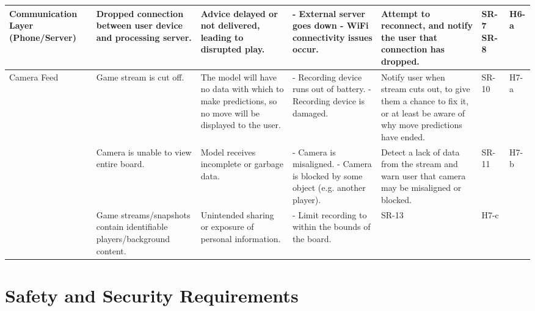 \documentclass{article}
\begin{document}
\begin{landscape}
\begin{tabularx}{\linewidth}{|P{2.5cm}|Y|Y|Y|Y|P{1cm}|P{1cm}|}
        \hline

        Communication Layer (Phone/Server) &
        Dropped connection between user device and processing server. &
        Advice delayed or not delivered, leading to disrupted play. &
        - External server goes down \newline - WiFi connectivity issues occur. &
        Attempt to reconnect, and notify the user that connection has dropped. &
        SR-7 \newline SR-8 &
        H6-a \\

        \hline

        Camera Feed &
        Game stream is cut off. &
        The model will have no data with which to make predictions, so no move will be displayed to the user. &
        - Recording device runs out of battery. \newline - Recording device is damaged. &
        Notify user when stream cuts out, to give them a chance to fix it, or at least be aware of why move predictions have ended. &
        SR-10 &
        H7-a \\

        &
        Camera is unable to view entire board. &
        Model receives incomplete or garbage data. &
        - Camera is misaligned. \newline - Camera is blocked by some object (e.g. another player). &
        Detect a lack of data from the stream and warn user that camera may be misaligned or blocked. &
        SR-11 &
        H7-b \\

        &
        Game streams/snapshots contain identifiable players/background content.
        &
        Unintended sharing or exposure of personal information. &
        - Limit recording to within the bounds of the board. &
        SR-13 &
        H7-c \\

    \end{tabularx}
\end{landscape}

\section{Safety and Security Requirements}\label{sec:safety-and-security-requirements}

\end{document}
